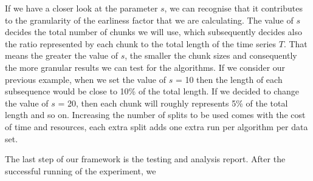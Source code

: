 If we have a closer look at the parameter $s$, we can recognise that it contributes to the granularity of the earliness factor that we are calculating.
The value of $s$ decides the total number of chunks we will use, which subsequently decides also the ratio represented by each chunk to the total length of the time series $T$.
That means the greater the value of $s$, the smaller the chunk sizes and consequently the more granular results we can test for the algorithms.
If we consider our previous example, when we set the value of $s$ = 10 then the length of each subsequence would be close to 10\% of the total length.
If we decided to change the value of $s$ = 20, then each chunk will roughly represents 5\% of the total length and so on.
Increasing the number of splits to be used comes with the cost of time and resources, each extra split adds one extra run per algorithm per data set.

The last step of our framework is the testing and analysis report.
After the successful running of the experiment, we 
